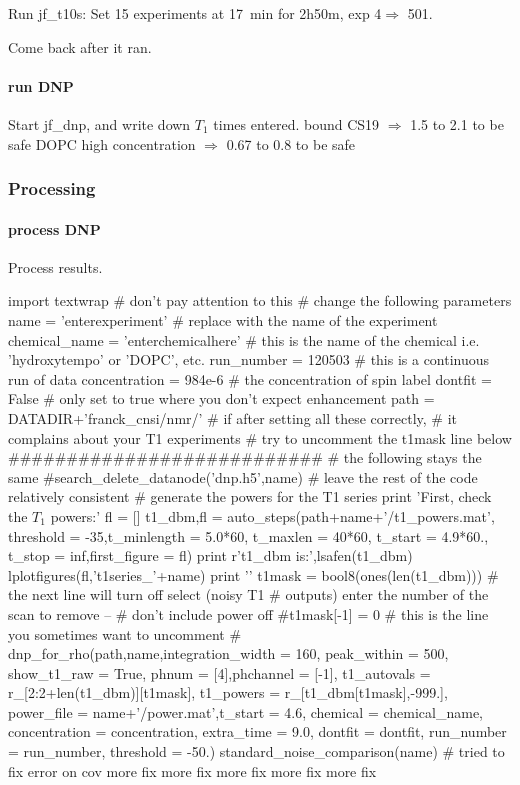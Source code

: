 Run jf\_t10s:
Set 15 experiments at 17~min for 2h50m, exp 4$\Rightarrow$ 501.

Come back after it ran.

\paragraph{run DNP}
Start jf\_dnp, and write down $T_1$ times entered.
bound CS19 $\Rightarrow$ 1.5 to 2.1 to be safe
DOPC high concentration $\Rightarrow$ 0.67 to 0.8 to be safe

\subsubsection{Processing}

\paragraph{process DNP}
Process results.


\begin{scriptsize}
\begin{python}[off]
import textwrap # don't pay attention to this
# change the following parameters
name = 'enterexperiment' # replace with the name of the experiment
chemical_name = 'enterchemicalhere' # this is the name of the chemical i.e. 'hydroxytempo' or 'DOPC', etc.
run_number = 120503 # this is a continuous run of data
concentration = 984e-6 # the concentration of spin label
dontfit = False # only set to true where you don't expect enhancement
path = DATADIR+'franck_cnsi/nmr/'
# if after setting all these correctly,
# it complains about your T1 experiments
# try to uncomment the t1mask line below
###########################
# the following stays the same
#search_delete_datanode('dnp.h5',name)
# leave the rest of the code relatively consistent
#{{{ generate the powers for the T1 series
print 'First, check the $T_1$ powers:\n\n'
fl = []
t1_dbm,fl = auto_steps(path+name+'/t1_powers.mat',
    threshold = -35,t_minlength = 5.0*60,
    t_maxlen = 40*60, t_start = 4.9*60.,
    t_stop = inf,first_figure = fl)
print r't1\_dbm is:',lsafen(t1_dbm)
lplotfigures(fl,'t1series_'+name)
print '\n\n'
t1mask = bool8(ones(len(t1_dbm)))
# the next line will turn off select (noisy T1
# outputs) enter the number of the scan to remove --
# don't include power off
#t1mask[-1] = 0 # this is the line you sometimes want to uncomment
#}}}
dnp_for_rho(path,name,integration_width = 160,
        peak_within = 500, show_t1_raw = True,
        phnum = [4],phchannel = [-1],
        t1_autovals = r_[2:2+len(t1_dbm)][t1mask],
        t1_powers = r_[t1_dbm[t1mask],-999.],
        power_file = name+'/power.mat',t_start = 4.6,
        chemical = chemical_name,
        concentration = concentration,
        extra_time = 9.0,
        dontfit = dontfit,
        run_number = run_number,
        threshold = -50.)
standard_noise_comparison(name)
# tried to fix error on cov more fix more fix more fix more fix more fix
\end{python}
\end{scriptsize}

